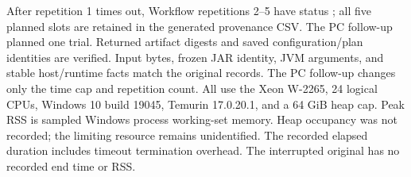 After repetition 1 times out, Workflow repetitions 2--5 have status ; all five planned slots are retained in the generated provenance CSV. The PC follow-up planned one trial.
Returned artifact digests and saved configuration/plan identities are verified. Input bytes, frozen JAR identity, JVM arguments, and stable host/runtime facts match the original records. The PC follow-up changes only the time cap and repetition count. All use the Xeon W-2265, 24 logical CPUs, Windows 10 build 19045, Temurin 17.0.20.1, and a 64 GiB heap cap.
Peak RSS is sampled Windows process working-set memory. Heap occupancy was not recorded; the limiting resource remains unidentified. The recorded elapsed duration includes timeout termination overhead. The interrupted original has no recorded end time or RSS.

